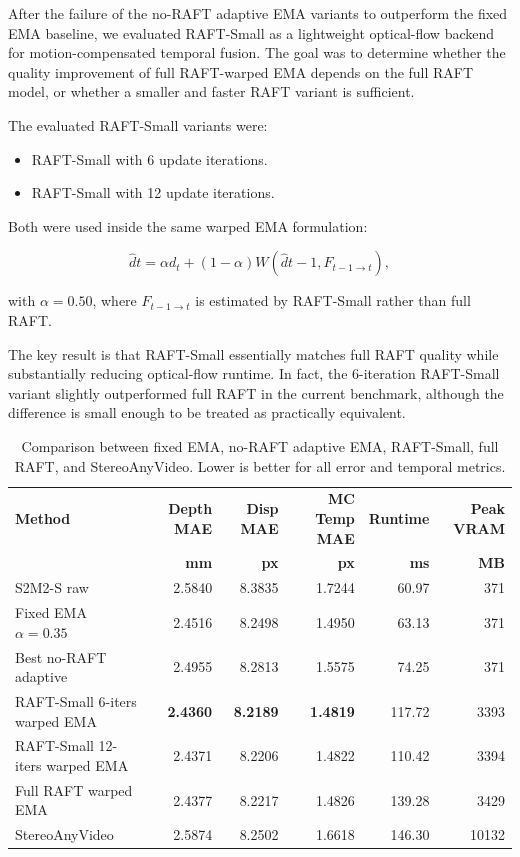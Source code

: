 \documentclass[11pt,a4paper]{article}
\begin{document}
After the failure of the no-RAFT adaptive EMA variants to outperform the fixed EMA baseline, we evaluated RAFT-Small as a lightweight optical-flow backend for motion-compensated temporal fusion. The goal was to determine whether the quality improvement of full RAFT-warped EMA depends on the full RAFT model, or whether a smaller and faster RAFT variant is sufficient.

The evaluated RAFT-Small variants were:

\begin{itemize}[leftmargin=*]
\item RAFT-Small with 6 update iterations.
\item RAFT-Small with 12 update iterations.
\end{itemize}

Both were used inside the same warped EMA formulation:

\begin{equation}
\hat{d}t = \alpha d_t + (1-\alpha)W(\hat{d}{t-1}, F_{t-1 \rightarrow t}),
\end{equation}

with $\alpha=0.50$, where $F_{t-1 \rightarrow t}$ is estimated by RAFT-Small rather than full RAFT.

The key result is that RAFT-Small essentially matches full RAFT quality while substantially reducing optical-flow runtime. In fact, the 6-iteration RAFT-Small variant slightly outperformed full RAFT in the current benchmark, although the difference is small enough to be treated as practically equivalent.

\begin{table}[t]
\centering
\caption{Comparison between fixed EMA, no-RAFT adaptive EMA, RAFT-Small, full RAFT, and StereoAnyVideo. Lower is better for all error and temporal metrics.}
\label{tab:raft-small-results}
\scriptsize
\begin{tabular}{lrrrrr}
\toprule
\textbf{Method} & \textbf{Depth MAE} & \textbf{Disp MAE} & \textbf{MC Temp MAE} & \textbf{Runtime} & \textbf{Peak VRAM} \\
 & \textbf{mm} & \textbf{px} & \textbf{px} & \textbf{ms} & \textbf{MB} \\
\midrule
S2M2-S raw & 2.5840 & 8.3835 & 1.7244 & 60.97 & 371 \\
Fixed EMA $\alpha=0.35$ & 2.4516 & 8.2498 & 1.4950 & 63.13 & 371 \\
Best no-RAFT adaptive & 2.4955 & 8.2813 & 1.5575 & 74.25 & 371 \\
RAFT-Small 6-iters warped EMA & \textbf{2.4360} & \textbf{8.2189} & \textbf{1.4819} & 117.72 & 3393 \\
RAFT-Small 12-iters warped EMA & 2.4371 & 8.2206 & 1.4822 & 110.42 & 3394 \\
Full RAFT warped EMA & 2.4377 & 8.2217 & 1.4826 & 139.28 & 3429 \\
StereoAnyVideo & 2.5874 & 8.2502 & 1.6618 & 146.30 & 10132 \\
\bottomrule
\end{tabular}
\end{table}
\end{document}
